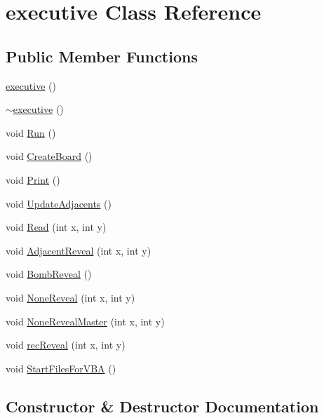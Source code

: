 \hypertarget{classexecutive}{}\section{executive Class Reference}
\label{classexecutive}
\subsection*{Public Member Functions}
\begin{DoxyCompactItemize}
\item 
\mbox{\hyperlink{classexecutive_af89b69f24d47db479a8fc99c1905ddda}{executive}} ()
\item 
\mbox{\hyperlink{classexecutive_a0d6dc7441c758d7c1fa3a375720e6952}{$\sim$executive}} ()
\item 
void \mbox{\hyperlink{classexecutive_a979d10f76a13e75a3d003fcbd7d224ad}{Run}} ()
\item 
void \mbox{\hyperlink{classexecutive_adccfcb025102490e13fd355d9c8bb3e8}{Create\+Board}} ()
\item 
void \mbox{\hyperlink{classexecutive_ae5e04159c4d86678485e4d788f302732}{Print}} ()
\item 
void \mbox{\hyperlink{classexecutive_a19c71fe2ec927ef624ef9dfb155fccc9}{Update\+Adjacents}} ()
\item 
void \mbox{\hyperlink{classexecutive_ab92cac9cdd28c568d079653c516c6a35}{Read}} (int x, int y)
\item 
void \mbox{\hyperlink{classexecutive_af6ca8c7e37912f612009a96a90113204}{Adjacent\+Reveal}} (int x, int y)
\item 
void \mbox{\hyperlink{classexecutive_a75c3e0d1420e409b8e955fc88d885b8b}{Bomb\+Reveal}} ()
\item 
void \mbox{\hyperlink{classexecutive_aff9907584bb8cf4840af71a283182b50}{None\+Reveal}} (int x, int y)
\item 
void \mbox{\hyperlink{classexecutive_a8fecd4b8d669dc584d9e7b4ba43c0eb7}{None\+Reveal\+Master}} (int x, int y)
\item 
void \mbox{\hyperlink{classexecutive_ad2c46b69f5f3592067d26e3dd7280616}{rec\+Reveal}} (int x, int y)
\item 
void \mbox{\hyperlink{classexecutive_a29514ae2f55a8f5f951566d1520ed5d8}{Start\+Files\+For\+V\+BA}} ()
\end{DoxyCompactItemize}


\subsection{Constructor \& Destructor Documentation}
\mbox{\label{classexecutive_af89b69f24d47db479a8fc99c1905ddda}} 
